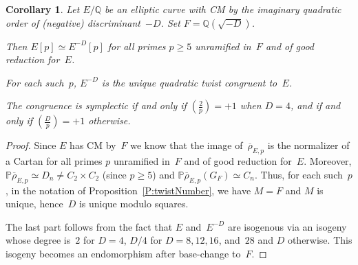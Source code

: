 \documentclass[12pt]{amsart}
\newcommand{\PP}{\mathbb{P}}
\newcommand{\Q}{\mathbb{Q}}
\newcommand{\rhobar}{{\overline{\rho}}}
\def\legendre#1#2{\left(\displaystyle\frac{#1}{#2}\right)}
\numberwithin{equation}{section}
\newtheorem{corollary}[theorem]{Corollary}
\theoremstyle{definition}
\theoremstyle{remark}
\begin{document}
\begin{corollary}\label{C:CM-twist}
  Let $E/\Q$ be an elliptic curve with CM by the
  imaginary quadratic order of (negative) discriminant~$-D$.  Set
  $F=\Q(\sqrt{-D})$.

  Then $E[p] \simeq E^{-D}[p]$ for all primes $p \geq 5$ unramified
  in~$F$ and of good reduction for~$E$.

  For each such~$p$, $E^{-D}$ is the unique quadratic twist congruent
  to~$E$.

  The congruence is symplectic if and only if $\legendre{2}{p}=+1$
  when $D=4$, and if and only if $\legendre{D}{p}=+1$ otherwise.
\end{corollary}
\begin{proof}
Since $E$ has CM by~$F$ we know that the image of~$\rhobar_{E,p}$ is
the normalizer of a Cartan for all primes $p$ unramified in~$F$ and of
good reduction for~$E$.  Moreover, $\PP \rhobar_{E,p} \simeq D_n \neq
C_2 \times C_2$ (since $p \geq 5$) and $\PP \rhobar_{E,p}(G_F) \simeq
C_n$. Thus, for each such~$p$, in the notation of
Proposition~\ref{P:twistNumber}, we have $M=F$ and $M$ is unique,
hence~$D$ is unique modulo squares.

The last part follows from the fact that $E$ and~$E^{-D}$ are
isogenous via an isogeny whose degree is~$2$ for $D=4$, $D/4$ for
$D=8,12,16$, and~$28$ and $D$ otherwise.  This isogeny becomes an
endomorphism after base-change to~$F$.
\end{proof}

\begin{comment}
Explanation of the isogeny degree:  we look for an element of the
order which is primitive (not divisible within the order by any
integer >1) so that the kernel is cyclic, and on which Galois acts as
it does on the twist isomorphism.  Apart from D=4 the latter
con-diction means that the element must be pure imaginary, which
uniquely determines it up to sign.  For D=4 we need a primitive
element of Z[i] whose conjugate is misapplied by i or -i.

D = 4: 1+i, norm 2
D = 16: 2i, norm 4

D = 8: Surat{-2}, norm 2

D = 3 and 12: Surat{-3}, norm 3
D = 27: 3*sqrt{-3}, norm 27

D = 7 and 28: sqrt{-7], norm 7

D = p = 11, 19, 43, 67, 163: sqrt{-p}, norm p

The fact of 4 for D=16,8,12,28 does not affect the legendre symbol but
the factor of 2 for D=4 does!
\end{comment}
\end{document}
